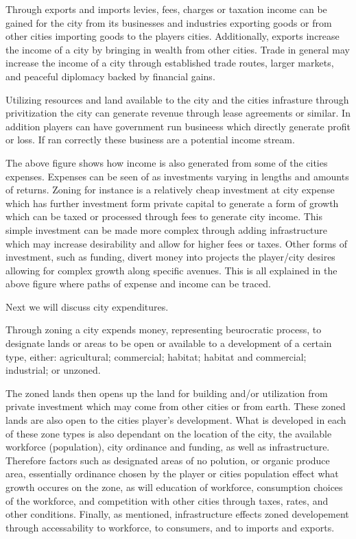 Through exports and imports levies, fees, charges or taxation income can be gained for the city from its businesses and industries exporting goods or from other cities importing goods to the players cities. Additionally, exports increase the income of a city by bringing in wealth from other cities. Trade in general may increase the income of a city through established trade routes, larger markets, and peaceful diplomacy backed by financial gains. 

Utilizing resources and land available to the city and the cities infrasture through privitization the city can generate revenue through lease agreements or similar. In addition players can have government run busineess which directly generate profit or loss. If ran correctly these business are a potential income stream. 


The above figure shows how income is also generated from some of the cities expenses. Expenses can be seen of as investments varying in lengths and amounts of returns. Zoning for instance is a relatively cheap investment at city expense which has further investment form private capital to generate a form of growth which can be taxed or processed through fees to generate city income. This simple investment can be made more complex through adding infrastructure which may increase desirability and allow for higher fees or taxes. Other forms of investment, such as funding, divert money into projects the player/city desires allowing for complex growth along specific avenues. This is all explained in the above figure where paths of expense and income can be traced.

Next we will discuss city expenditures.

Through zoning a city expends money, representing beurocratic process, to designate lands or areas to be open or available to a development of a certain type, either: agricultural; commercial; habitat; habitat and commercial; industrial; or unzoned.

The zoned lands then opens up the land for building and/or utilization from private investment which may come from other cities or from earth. These zoned lands are also open to the cities player's development. 
What is developed in each of these zone types is also dependant on the location of the city, the available workforce (population), city ordinance and funding, as well as infrastructure. Therefore factors such as designated areas of no polution, or organic produce area, essentially ordinance chosen by the player or cities population effect what growth occures on the zone, as will education of workforce, consumption choices of the workforce, and competition with other cities through taxes, rates, and other conditions. Finally, as mentioned, infrastructure effects zoned developement through accessability to workforce, to consumers, and to imports and exports.



